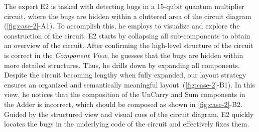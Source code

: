 The expert E2 is tasked with detecting bugs in a 15-qubit quantum multiplier circuit, where the bugs are hidden within a cluttered area of the circuit diagram (\cref{fig:case-2}-A1).
To accomplish this, he employs {\tname} to visualize and explore the construction of the circuit.
E2 starts by collapsing all sub-components to obtain an overview of the circuit.
After confirming the high-level structure of the circuit is correct in the \emph{Component View}, he guesses that the bugs are hidden within more detailed structures.
Thus, he drills down by expanding all components.
Despite the circuit becoming lengthy when fully expanded, our layout strategy ensures an organized and semantically meaningful layout~(\cref{fig:case-2}-B1).
In this view, he notices that the composition of the UnCarry and Sum components in the Adder is incorrect, which should be composed as shown in \cref{fig:case-2}-B2.
Guided by the structured view and visual cues of the circuit diagram, E2 quickly locates the bugs in the underlying code of the circuit and effectively fixes them.


